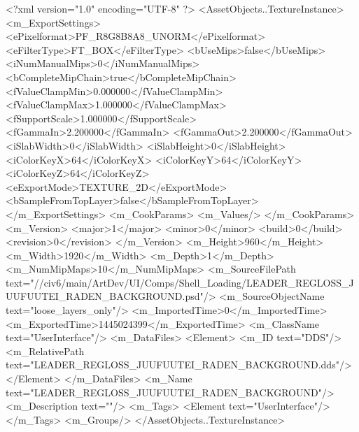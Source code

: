 <?xml version="1.0" encoding="UTF-8" ?>
<AssetObjects..TextureInstance>
	<m_ExportSettings>
		<ePixelformat>PF_R8G8B8A8_UNORM</ePixelformat>
		<eFilterType>FT_BOX</eFilterType>
		<bUseMips>false</bUseMips>
		<iNumManualMips>0</iNumManualMips>
		<bCompleteMipChain>true</bCompleteMipChain>
		<fValueClampMin>0.000000</fValueClampMin>
		<fValueClampMax>1.000000</fValueClampMax>
		<fSupportScale>1.000000</fSupportScale>
		<fGammaIn>2.200000</fGammaIn>
		<fGammaOut>2.200000</fGammaOut>
		<iSlabWidth>0</iSlabWidth>
		<iSlabHeight>0</iSlabHeight>
		<iColorKeyX>64</iColorKeyX>
		<iColorKeyY>64</iColorKeyY>
		<iColorKeyZ>64</iColorKeyZ>
		<eExportMode>TEXTURE_2D</eExportMode>
		<bSampleFromTopLayer>false</bSampleFromTopLayer>
	</m_ExportSettings>
	<m_CookParams>
		<m_Values/>
	</m_CookParams>
	<m_Version>
		<major>1</major>
		<minor>0</minor>
		<build>0</build>
		<revision>0</revision>
	</m_Version>
	<m_Height>960</m_Height>
	<m_Width>1920</m_Width>
	<m_Depth>1</m_Depth>
	<m_NumMipMaps>10</m_NumMipMaps>
	<m_SourceFilePath text="//civ6/main/ArtDev/UI/Comps/Shell_Loading/LEADER_REGLOSS_JUUFUUTEI_RADEN_BACKGROUND.psd"/>
	<m_SourceObjectName text="loose_layers_only"/>
	<m_ImportedTime>0</m_ImportedTime>
	<m_ExportedTime>1445024399</m_ExportedTime>
	<m_ClassName text="UserInterface"/>
	<m_DataFiles>
		<Element>
			<m_ID text="DDS"/>
			<m_RelativePath text="LEADER_REGLOSS_JUUFUUTEI_RADEN_BACKGROUND.dds"/>
		</Element>
	</m_DataFiles>
	<m_Name text="LEADER_REGLOSS_JUUFUUTEI_RADEN_BACKGROUND"/>
	<m_Description text=""/>
	<m_Tags>
		<Element text="UserInterface"/>
	</m_Tags>
	<m_Groups/>
</AssetObjects..TextureInstance>

